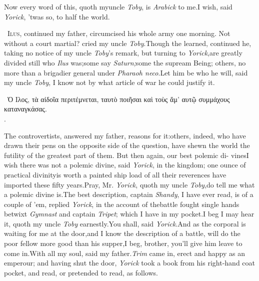 \documentclass{article}
\begin{document}
Now every word of this, quoth my\break uncle \textit{Toby}, is
\textit{Arabick} to me.\tsh I wish, said \textit{Yorick},
’twas so, to half the world.

\tsk\fnast\ \textsc{Ilus}, continued my father,
circumcised his whole army one morning.\break
\tsk Not without a court martial? cried my uncle \textit{Toby}.\tsh Though the learned, continued he,
taking no notice of my uncle \textit{Toby}’s remark, but turning to
\textit{Yo\-rick},\tsk are greatly divided still who \textit{Ilus}
was;\tsk some say \textit{Saturn;}\tsk some the supream Being;\tsk
others, no more than a brigadier general under
\textit{Pharaoh neco}.\break\tsh Let him be who he will, said my uncle
\textit{Toby}, I know not by what article of war he could justify it.

\vfill
\bgroup\footnotesize
\indent\fnast\ Ὁ Ιλος, τὰ αἰδοῖα περιτέμνεται, ταυτὸ
ποιῆ\-σαι καὶ τοὺς ἅμ’ αυτῷ συμμάχους καταναγκάσας.\\
\null\hfill{}.\par
\egroup
{}
\eject

The controvertists, answered my father,  reasons for it:\tsk others, indeed, who have drawn
their pens on the opposite side of the question, have shewn the
world the futility of the greatest part of them.\tsk\break
But then again, our best polemic di-\break 
vines\tsk I wish there was not a
polemic divine, said \textit{Yorick}, in the kingdom;\tsk\break
one ounce of practical divinity\tsk is worth a painted ship load of all
their reverences have imported these fifty years.\tsk Pray, Mr.
\textit{Yorick}, quoth my uncle \textit{Toby},\tsk do tell me what a
polemic divine is.\tsh\break The best description, captain
\textit{Shandy}, I have ever read, is of a couple of ’em,
replied \textit{Yorick}, in the account of the\break battle fought single
hands betwixt \textit{Gym\-nast} and captain \textit{Tripet}; which I
have in my pocket.\tsh I beg I may hear it, quoth my uncle
\textit{Toby} earnestly.\tsk You shall, said \textit{Yorick}.\tsk And as the corporal
is waiting for me at the door,\tsk and I 
know the description of a battle, will\break
do the poor fellow more good than his\break
supper,\tsk I beg, brother, you’ll give him\break
leave to come in.\tsk With all my soul,\break
said my father.\tsh \textit{Trim} came in, erect\break
and happy as an emperour; and having\break
shut the door, \textit{Yorick} took a book from\break
his right-hand coat pocket, and read, or\break
pretended to read, as follows.
\end{document}
